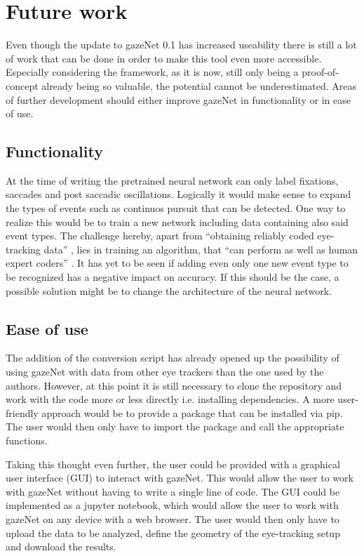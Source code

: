 \documentclass[conference]{IEEEtran}
\begin{document}
\section{Future work}
Even though the update to gazeNet 0.1 has increased useability there is still a lot of work that can be done in order to make this tool even more accessible. Especially considering the framework, as it is now, still only being a proof-of-concept already being so valuable, the potential cannot be underestimated. Areas of further development should either improve gazeNet in functionality or in ease of use.

\subsection{Functionality}
At the time of writing the pretrained neural network can only label fixations, saccades and post saccadic oscillations. Logically it would make sense to expand the types of events such as continuos pursuit that can be detected. One way to realize this would be to train a new network including data containing also said event types. The challenge hereby, apart from ``obtaining reliably coded eye-tracking data'' \citet{zemblys2018gazeNet}, lies in training an algorithm, that ``can perform as well as human expert coders'' \citet{zemblys2018gazeNet}. It has yet to be seen if adding even only one new event type to be recognized has a negative impact on accuracy. If this should be the case, a possible solution might be to change the architecture of the neural network.

\subsection{Ease of use}
The addition of the conversion script has already opened up the possibility of using gazeNet with data from other eye trackers than the one used by the authors. However, at this point it is still necessary to clone the repository and work with the code more or less directly i.e. installing dependencies. A more user-friendly approach would be to provide a package that can be installed via pip. The user would then only have to import the package and call the appropriate functions.

Taking this thought even further, the user could be provided with a graphical user interface (GUI) to interact with gazeNet. This would allow the user to work with gazeNet without having to write a single line of code. The GUI could be implemented as a jupyter notebook, which would allow the user to work with gazeNet on any device with a web browser. The user would then only have to upload the data to be analyzed, define the geometry of the eye-tracking setup and download the results.



\end{document}
